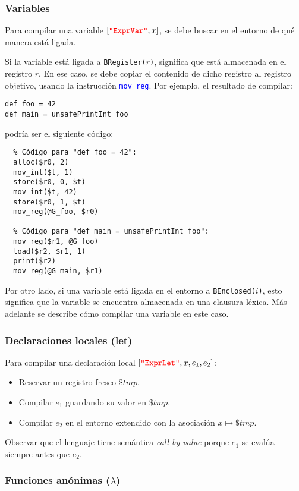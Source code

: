 \documentclass{article}
\newcommand{\astkw}[1]{\texttt{\textcolor{red}{"#1"}}}
\newcommand{\instruction}[1]{\texttt{\textcolor{blue}{#1}}}
\begin{document}
\subsubsection{Variables}

Para compilar una variable $[\astkw{ExprVar}, x]$,
se debe buscar en el entorno de qué manera está ligada.

Si la variable está ligada a \texttt{BRegister($r$)},
significa que está almacenada en el registro $r$. En ese caso,
se debe copiar el contenido de dicho registro al registro objetivo,
usando la instrucción \instruction{mov\_reg}.
Por ejemplo, el resultado de compilar:
\begin{verbatim}
def foo = 42
def main = unsafePrintInt foo
\end{verbatim}
podría ser el siguiente código:
\begin{verbatim}
  % Código para "def foo = 42":
  alloc($r0, 2)
  mov_int($t, 1)
  store($r0, 0, $t)
  mov_int($t, 42)
  store($r0, 1, $t)
  mov_reg(@G_foo, $r0)

  % Código para "def main = unsafePrintInt foo":
  mov_reg($r1, @G_foo)
  load($r2, $r1, 1)
  print($r2)
  mov_reg(@G_main, $r1)
\end{verbatim}

Por otro lado,
si una variable está ligada en el entorno a \texttt{BEnclosed($i$)},
esto significa que la variable se encuentra almacenada en una
clausura léxica. Más adelante se describe cómo compilar una variable
en este caso.

\subsubsection{Declaraciones locales (let)}

Para compilar una declaración local $[\astkw{ExprLet}, x, e_1, e_2]$:
\begin{itemize}
\item Reservar un registro fresco $\$tmp$.
\item Compilar $e_1$ guardando su valor en $\$tmp$.
\item Compilar $e_2$ en el entorno extendido con la asociación
      $x \mapsto \$tmp$.
\end{itemize}
Observar que el lenguaje tiene semántica {\em call-by-value}
porque $e_1$ se evalúa siempre antes que $e_2$.

\subsubsection{Funciones anónimas ($\lambda$)}
\end{document}
